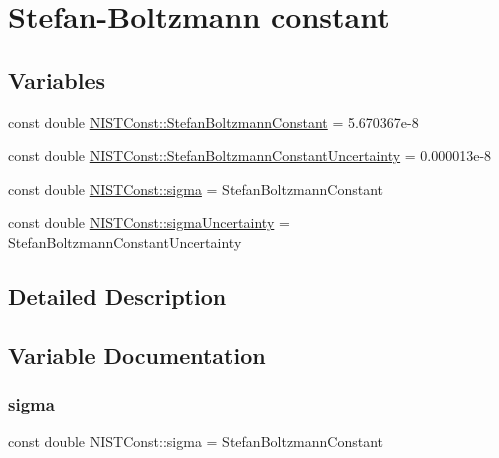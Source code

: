 \hypertarget{group___stefan_boltzmann_constant}{}\section{Stefan-\/\+Boltzmann constant}
\label{group___stefan_boltzmann_constant}
\subsection*{Variables}
\begin{DoxyCompactItemize}
\item 
const double \hyperlink{group___stefan_boltzmann_constant_ga1094e420290686333202d186399d706d}{N\+I\+S\+T\+Const\+::\+Stefan\+Boltzmann\+Constant} = 5.\+670367e-\/8
\item 
const double \hyperlink{group___stefan_boltzmann_constant_ga98b40b4f7ea1cd358d0a140bf8f6973c}{N\+I\+S\+T\+Const\+::\+Stefan\+Boltzmann\+Constant\+Uncertainty} = 0.\+000013e-\/8
\item 
const double \hyperlink{group___stefan_boltzmann_constant_ga73dd51ea1c04650cc4d93c7a454c7b8f}{N\+I\+S\+T\+Const\+::sigma} = Stefan\+Boltzmann\+Constant
\item 
const double \hyperlink{group___stefan_boltzmann_constant_ga0b88b9501b1c17b97f06de9ab7ba71f2}{N\+I\+S\+T\+Const\+::sigma\+Uncertainty} = Stefan\+Boltzmann\+Constant\+Uncertainty
\end{DoxyCompactItemize}


\subsection{Detailed Description}


\subsection{Variable Documentation}
\mbox{\label{group___stefan_boltzmann_constant_ga73dd51ea1c04650cc4d93c7a454c7b8f}} 
\subsubsection{\texorpdfstring{sigma}{sigma}}
{\footnotesize\ttfamily const double N\+I\+S\+T\+Const\+::sigma = Stefan\+Boltzmann\+Constant}

